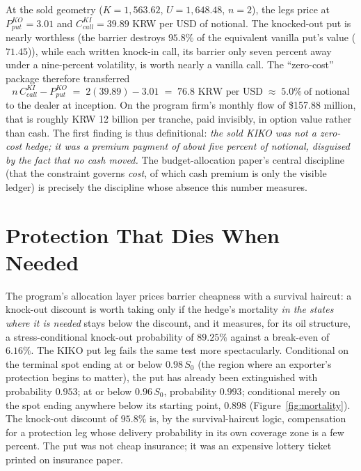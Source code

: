 \documentclass[11pt,a4paper]{article}
\begin{document}
At the sold geometry ($K=1{,}563.62$, $U=1{,}648.48$, $n=2$), the legs price at $P_{put}^{KO}=3.01$ and $C_{call}^{KI}=39.89$ KRW per USD of notional. The knocked-out put is nearly worthless (the barrier destroys $95.8\%$ of the equivalent vanilla put's value ($71.45$)), while each written knock-in call, its barrier only seven percent away under a nine-percent volatility, is worth nearly a vanilla call. The ``zero-cost'' package therefore transferred
\begin{equation}
n\,C_{call}^{KI}-P_{put}^{KO} \;=\; 2(39.89)-3.01 \;=\; 76.8 \text{ KRW per USD} \;\approx\; 5.0\%\ \text{of notional}
\label{eq:margin}
\end{equation}
to the dealer at inception. On the program firm's monthly flow of \$157.88 million, that is roughly KRW 12 billion per tranche, paid invisibly, in option value rather than cash. The first finding is thus definitional: \emph{the sold KIKO was not a zero-cost hedge; it was a premium payment of about five percent of notional, disguised by the fact that no cash moved.} The budget-allocation paper's central discipline (that the constraint governs \emph{cost}, of which cash premium is only the visible ledger) is precisely the discipline whose absence this number measures.

\section{Protection That Dies When Needed}
\label{sec:mortality}

The program's allocation layer prices barrier cheapness with a survival haircut: a knock-out discount is worth taking only if the hedge's mortality \emph{in the states where it is needed} stays below the discount, and it measures, for its oil structure, a stress-conditional knock-out probability of $89.25\%$ against a break-even of $6.16\%$. The KIKO put leg fails the same test more spectacularly. Conditional on the terminal spot ending at or below $0.98\,S_0$ (the region where an exporter's protection begins to matter), the put has already been extinguished with probability $0.953$; at or below $0.96\,S_0$, probability $0.993$; conditional merely on the spot ending anywhere below its starting point, $0.898$ (Figure~\ref{fig:mortality}). The knock-out discount of $95.8\%$ is, by the survival-haircut logic, compensation for a protection leg whose delivery probability in its own coverage zone is a few percent. The put was not cheap insurance; it was an expensive lottery ticket printed on insurance paper.
\end{document}
